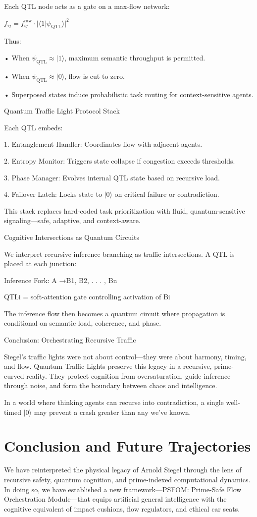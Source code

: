 \documentclass[11pt]{article}
\begin{document}
Each QTL node acts as a gate on a max-flow network:

$f_{ij} = f_{ij}^{\text{raw}} \cdot |\langle 1 | \psi_{\text{QTL}} \rangle|^2$

Thus:

• When $\psi_{\text{QTL}} \approx |1\rangle$, maximum semantic throughput is permitted.

• When $\psi_{\text{QTL}} \approx |0\rangle$, flow is cut to zero.

• Superposed states induce probabilistic task routing for context-sensitive agents.

Quantum Traffic Light Protocol Stack

Each QTL embeds:

1. Entanglement Handler: Coordinates flow with adjacent agents.

2. Entropy Monitor: Triggers state collapse if congestion exceeds thresholds.

3. Phase Manager: Evolves internal QTL state based on recursive load.

4. Failover Latch: Locks state to $|0\rangle$ on critical failure or contradiction.

This stack replaces hard-coded task prioritization with fluid, quantum-sensitive signaling—safe, adaptive, and context-aware.

Cognitive Intersections as Quantum Circuits

We interpret recursive inference branching as traffic intersections. A QTL is placed at each junction:

Inference Fork: A →{B1, B2, . . . , Bn}

QTLi = soft-attention gate controlling activation of Bi

The inference flow then becomes a quantum circuit where propagation is conditional on semantic load, coherence, and phase.

Conclusion: Orchestrating Recursive Traffic

Siegel’s traffic lights were not about control—they were about harmony, timing, and flow. Quantum Traffic Lights preserve this legacy in a recursive, prime-curved reality. They protect cognition from oversaturation, guide inference through noise, and form the boundary between chaos and intelligence.

In a world where thinking agents can recurse into contradiction, a single well-timed $|0\rangle$ may prevent a crash greater than any we’ve known.

\section{Conclusion and Future Trajectories}
We have reinterpreted the physical legacy of Arnold Siegel through the lens of recursive safety, quantum cognition, and prime-indexed computational dynamics. In doing so, we have established a new framework—PSFOM: Prime-Safe Flow Orchestration Module—that equips artificial general intelligence with the cognitive equivalent of impact cushions, flow regulators, and ethical car seats.
\end{document}
